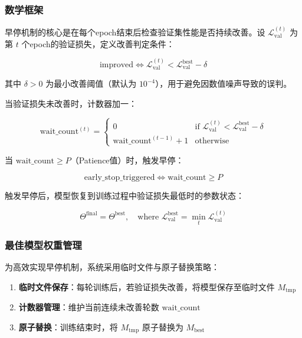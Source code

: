 \documentclass[UTF8, a4paper, 12pt]{article}
\begin{document}
\subsubsection{数学框架}

早停机制的核心是在每个epoch结束后检查验证集性能是否持续改善。设 $\mathcal{L}_{\text{val}}^{(t)}$ 为第 $t$ 个epoch的验证损失，定义改善判定条件：

\begin{equation}
\text{improved} \iff \mathcal{L}_{\text{val}}^{(t)} < \mathcal{L}_{\text{val}}^{\text{best}} - \delta
\end{equation}

其中 $\delta > 0$ 为最小改善阈值（默认为 $10^{-4}$），用于避免因数值噪声导致的误判。

当验证损失未改善时，计数器加一：

\begin{equation}
\text{wait\_count}^{(t)} = \begin{cases}
0 & \text{if } \mathcal{L}_{\text{val}}^{(t)} < \mathcal{L}_{\text{val}}^{\text{best}} - \delta \\
\text{wait\_count}^{(t-1)} + 1 & \text{otherwise}
\end{cases}
\end{equation}

当 $\text{wait\_count} \geq P$（Patience值）时，触发早停：

\begin{equation}
\text{early\_stop\_triggered} \iff \text{wait\_count} \geq P
\end{equation}

触发早停后，模型恢复到训练过程中验证损失最低时的参数状态：

\begin{equation}
\Theta^{\text{final}} = \Theta^{\text{best}}, \quad \text{where } \mathcal{L}_{\text{val}}^{\text{best}} = \min_t \mathcal{L}_{\text{val}}^{(t)}
\end{equation}

\subsubsection{最佳模型权重管理}

为高效实现早停机制，系统采用临时文件与原子替换策略：

\begin{enumerate}
    \item \textbf{临时文件保存}：每轮训练后，若验证损失改善，将模型保存至临时文件 $M_{\text{tmp}}$
    \item \textbf{计数器管理}：维护当前连续未改善轮数 $\text{wait\_count}$
    \item \textbf{原子替换}：训练结束时，将 $M_{\text{tmp}}$ 原子替换为 $M_{\text{best}}$
\end{enumerate}
\end{document}
